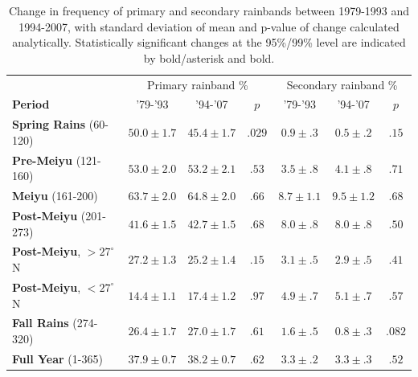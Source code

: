\documentclass[final,grl]{agutexSI}
\begin{document}
\begin{table}

\centering

\caption{Change in frequency of primary and secondary rainbands between 1979-1993 and 1994-2007, with standard deviation of mean and p-value of change calculated analytically. Statistically significant changes at the 95\%/99\% level are indicated by bold/asterisk and bold.}

\begin{tabular}{ l c c c c c c}
	& \multicolumn{3}{c}{Primary rainband \%} & \multicolumn{3}{c}{Secondary rainband \%} \\
	\textbf{Period} & '79-'93 & '94-'07 & $p$ & '79-'93 & '94-'07 & $p$ \\
	\hline	
	\textbf{Spring Rains} (60-120)		& $50.0 \pm 1.7$ & $45.4 \pm 1.7$ & $ .029 $ 	& $0.9 \pm .3$ 	& $0.5 \pm .2$ & $.15$ \\
	\textbf{Pre-Meiyu} (121-160) 		& $53.0 \pm 2.0$ & $53.2 \pm 2.1$ & $ .53$ 	& $3.5 \pm .8$ 	& $4.1 \pm .8$ & $.71$ \\
	\textbf{Meiyu} (161-200)			& $63.7 \pm 2.0$ & $64.8 \pm 2.0$ & $ .66 $ 	& $8.7 \pm 1.1$ 	& $9.5 \pm 1.2$  & $.68$ \\
	\textbf{Post-Meiyu} (201-273)		& $41.6 \pm 1.5$ & $42.7 \pm 1.5$ & $ .68 $	& $8.0 \pm .8$ 	& $8.0 \pm .8$ & $.50$ \\
	\textbf{Post-Meiyu}, $>27^\circ$N 	& $27.2 \pm 1.3$ & $25.2 \pm 1.4$ & $ .15 $ 	& $3.1 \pm .5$ 	& $2.9 \pm .5$ & $.41$ \\
	\textbf{Post-Meiyu}, $<27^\circ$N 	& $14.4 \pm 1.1 $ & $17.4 \pm 1.2$ & $ .97 $ 	& $4.9 \pm .7$ 	& $5.1 \pm .7$ & $.57$  \\
	\textbf{Fall Rains} (274-320)			& $26.4 \pm 1.7 $ & $27.0 \pm 1.7$ & $ .61 $ 	& $1.6 \pm .5$ 	& $0.8 \pm .3$ & $.082$ \\
	\textbf{Full Year} (1-365)			& $37.9 \pm 0.7 $ & $38.2 \pm 0.7$ & $ .62 $ 	& $3.3 \pm .2$ 	& $3.3 \pm .3$ & $.52$ \\

\end{tabular}
\label{ts7}
\end{table}
\end{document}
